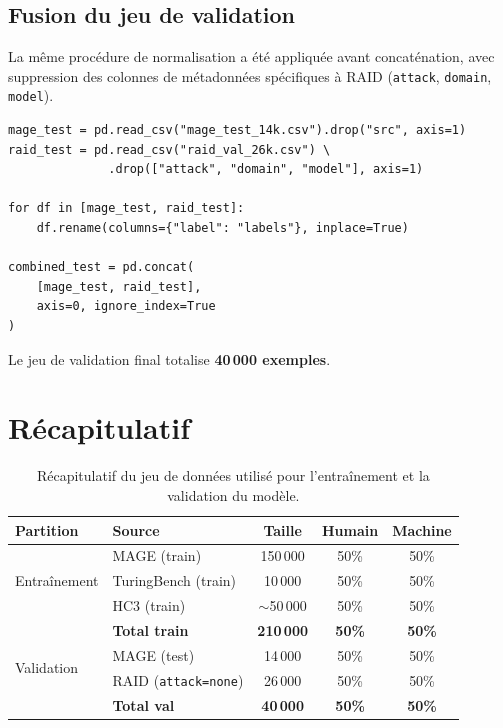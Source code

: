 ﻿\documentclass[12pt, a4paper]{report}
\begin{document}
\subsection{Fusion du jeu de validation}

La même procédure de normalisation a été appliquée avant concaténation, avec
suppression des colonnes de métadonnées spécifiques à RAID (\texttt{attack},
\texttt{domain}, \texttt{model}).

\begin{verbatim}
mage_test = pd.read_csv("mage_test_14k.csv").drop("src", axis=1)
raid_test = pd.read_csv("raid_val_26k.csv") \
              .drop(["attack", "domain", "model"], axis=1)

for df in [mage_test, raid_test]:
    df.rename(columns={"label": "labels"}, inplace=True)

combined_test = pd.concat(
    [mage_test, raid_test],
    axis=0, ignore_index=True
)
\end{verbatim}

Le jeu de validation final totalise \textbf{40\,000 exemples}.

\section{Récapitulatif}

\begin{table}[H]
\centering
\renewcommand{\arraystretch}{1.4}
\begin{tabular}{llccc}
\toprule
\textbf{Partition} & \textbf{Source} & \textbf{Taille} 
  & \textbf{Humain} & \textbf{Machine} \\
\midrule
\multirow{3}{*}{Entraînement}
  & MAGE (train)       & 150\,000 & 50\% & 50\% \\
  & TuringBench (train)&  10\,000 & 50\% & 50\% \\
  & HC3 (train)        & $\sim$50\,000 & 50\% & 50\% \\
\midrule
  & \textbf{Total train} & \textbf{210\,000} & \textbf{50\%} & \textbf{50\%} \\
\midrule
\multirow{2}{*}{Validation}
  & MAGE (test)        &  14\,000 & 50\% & 50\% \\
  & RAID (\texttt{attack=none}) & 26\,000 & 50\% & 50\% \\
\midrule
  & \textbf{Total val} & \textbf{40\,000} & \textbf{50\%} & \textbf{50\%} \\
\bottomrule
\end{tabular}
\caption{Récapitulatif du jeu de données utilisé pour l'entraînement et la
validation du modèle.}
\label{tab:dataset}
\end{table}
\end{document}
